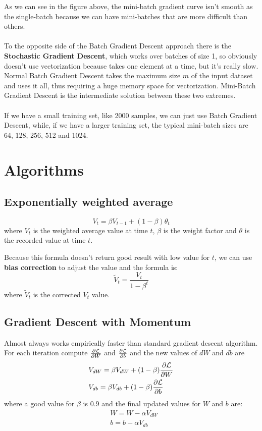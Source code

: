 \documentclass[oneside]{academica}
\begin{document}
As we can see in the figure above, the mini-batch gradient curve isn't smooth as the single-batch because we can have mini-batches that are more difficult than others.
\\\\
To the opposite side of the Batch Gradient Descent approach there is the \textbf{Stochastic Gradient Descent}, which works over batches of size 1, so obviously doesn't use vectorization because takes one element at a time, but it's really slow.
Normal Batch Gradient Descent takes the maximum size $m$ of the input dataset and uses it all, thus requiring a huge memory space for vectorization.
Mini-Batch Gradient Descent is the intermediate solution between these two extremes.
\\\\
If we have a small training set, like 2000 samples, we can just use Batch Gradient Descent, while, if we have a larger training set, the typical mini-batch sizes are 64, 128, 256, 512 and 1024.

\section{Algorithms}

\subsection{Exponentially weighted average}
\begin{equation*}
  V_t = \beta V_{t-1} + (1-\beta) \theta_t
\end{equation*}
where $V_t$ is the weighted average value at time $t$, $\beta$ is the weight factor and $\theta$ is the recorded value at time $t$.

\newpage

Because this formula doesn't return good result with low value for $t$, we can use \textbf{bias correction} to adjust the value and the formula is:
\begin{equation*}
  \tilde{V}_t = \frac{V_t}{1-\beta^t}
\end{equation*}
where $\tilde{V}_t$ is the corrected $V_t$ value.

\subsection{Gradient Descent with Momentum}

Almost always works empirically faster than standard gradient descent algorithm.
For each iteration compute $\frac{\partial \mathcal{L}}{\partial W}$ and $\frac{\partial \mathcal{L}}{\partial b}$ and the new values of $dW$ and $db$ are
\begin{align*}
  & V_{dW} = \beta V_{dW} + (1-\beta) \frac{\partial \mathcal{L}}{\partial W} \\
  & V_{db} = \beta V_{db} + (1-\beta) \frac{\partial \mathcal{L}}{\partial b}
\end{align*}
where a good value for $\beta$ is $0.9$ and the final updated values for $W$ and $b$ are:
\begin{align*}
  & W = W - \alpha V_{dW} \\
  & b = b - \alpha V_{db}
\end{align*}
\end{document}
